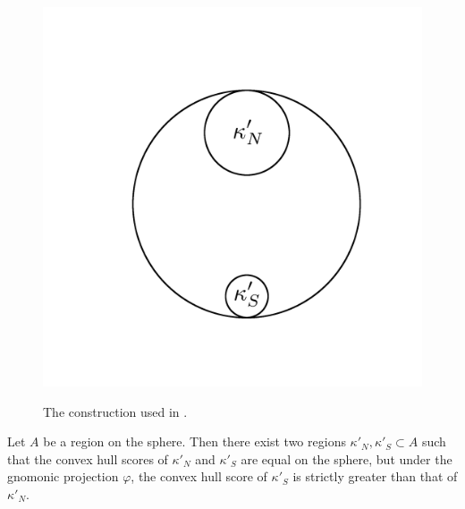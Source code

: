 \begin{figure}
	\centering
	\includegraphics[width=.8\textwidth]{figs/differentkappa}\\[1.5em]
	\caption{ The construction used in . }
	\label{fig:caphr}
\end{figure}

\begin{theorem}
	\label{thm:convhull}
	Let $A$ be a region on the sphere.  Then there exist two regions $\kappa'_N,\kappa'_S\subset A$ such that the convex hull scores of $\kappa'_N$ and $\kappa'_S$ are equal on the sphere, but under the gnomonic projection $\varphi$, the convex hull score of $\kappa'_S$ is strictly greater than that of $\kappa'_N$. 
\end{theorem}

